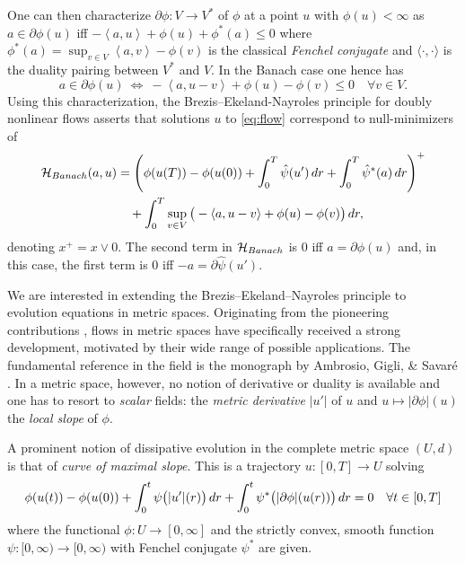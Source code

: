 \documentclass[10pt,a4paper]{amsart}
\newcommand{\dr}{{\rm d} r}
\renewcommand{\sl}{|\partial \phi|}
\newcommand{\lan}{\left\langle}
\newcommand{\ran}{\right\rangle}
\newcommand{\HH}{{\mathcal H}}
\begin{document}
One can then characterize $\partial \phi: V \to
V^*$ of $\phi$ at a point $u $ with
                                $\phi(u)<\infty$ as
$a \in \partial \phi(u) $ iff $-\lan a , u
\ran + \phi(u) + \phi^*(a)\leq 0$
where $ \phi^*(a) = \sup_{v\in V}\lan a, v \ran -\phi(v)$
is the classical {\it Fenchel conjugate} and $\langle\cdot,\cdot\rangle$ is the duality pairing between
$V^*$ and $V$. In the Banach case one hence
has
\begin{equation}\label{eq:Banach_Fenchel_charac}
    a \in \partial \phi(u)  \ \Leftrightarrow \ -\lan a , u-v
\ran + \phi(u) -\phi(v)\leq 0 \quad \forall v \in V.
\end{equation}
Using this characterization, the Brezis--Ekeland-Nayroles principle for doubly nonlinear flows
\cite[Thm.~1.2]{be} asserts that solutions $u$ to \eqref{eq:flow} correspond
to  null-minimizers  of
\begin{align*}
    \HH_{\rm Banach}(a,u) &=
       \left(\phi(u(T))-\phi(u(0)) +\int_0^T \hat \psi( u') \, \dr +
                             \int_0^T  \hat \psi^*(a)\, \dr \right)^+ \\
  &\quad  +  \int_0^T \sup_{v\in V}\big( - 
                            \langle a,u-v \rangle +
    \phi(u) -\phi(v)\big)\, \dr, 
\end{align*}
denoting $x^+ =x\vee 0$. The  second term in $\HH_{\rm Banach}$ is $0$ iff $a =\partial
\phi(u)$ and, in this case, the first term is $0$ iff   $-a =
\partial \hat\psi(u')$. 




We are interested in extending the Brezis--Ekeland--Nayroles
principle to evolution equations in metric spaces. Originating from the pioneering
 contributions \cite{JKO,Otto01},  flows in metric spaces have
 specifically received
 a strong development, motivated by their wide range of possible
 applications. The fundamental reference in the field is the monograph
 by {\sc Ambrosio, Gigli, \& Savar\'e} \cite{Ambrosio08}. In a metric space, however, no
notion of derivative  or duality  is available
and one has to
resort to {\it scalar} fields: the {\it metric
  derivative} $|u'|$ of $u$ and $u \mapsto \sl(u)$ the {\it local slope} of $\phi$.

 A  prominent  notion of dissipative evolution in the complete metric
 space $(U,d)$ is that of {\it curve of maximal slope}. This is
  a  trajectory $u:[0,T]\to U$ solving 
\begin{equation}
  \label{eq:intro_EDE}
  \phi(u(t)) - \phi(u(0)) + \int_0^t\psi\big(|u'|(r)\big) \, \dr +
  \int_0^t\psi^*\big(\sl(u(r))\big)\, \dr=0 \quad \forall t
  \in [0,T]
\end{equation}
where the functional $\phi:U \to [0,\infty]$ and the strictly convex,
smooth  function \linebreak $\psi:[0,\infty) \to [0,\infty)$ with Fenchel conjugate $\psi^*$ are
given.
 
\end{document}
